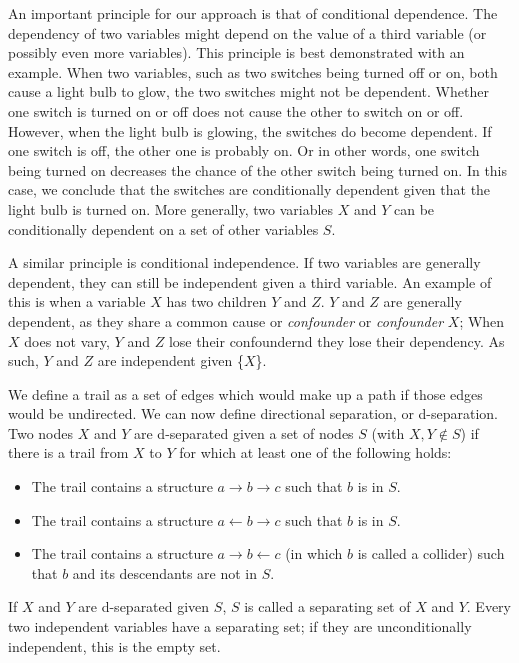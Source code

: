 \documentclass[a4paper, 10pt, english, onecolumn]{article}
\begin{document}
An important principle for our approach is that of conditional dependence.
The dependency of two variables might depend on the value of a third variable (or possibly even more variables).
This principle is best demonstrated with an example.
When two variables, such as two switches being turned off or on, both cause a light bulb to glow, the two switches might not be dependent.
Whether one switch is turned on or off does not cause the other to switch on or off.
However, when the light bulb is glowing, the switches do become dependent.
If one switch is off, the other one is probably on.
Or in other words, one switch being turned on decreases the chance of the other switch being turned on.
In this case, we conclude that the switches are conditionally dependent given that the light bulb is turned on.
More generally, two variables $X$ and $Y$ can be conditionally dependent on a set of other variables $S$. %

A similar principle is conditional independence.
If two variables are generally dependent, they can still be independent given a third variable.
An example of this is when a variable $X$ has two children $Y$ and $Z$.
$Y$ and $Z$ are generally dependent, as they share a common cause or \emph{confounder} or \emph{confounder} $X$;
When $X$ does not vary, $Y$ and $Z$ lose their confoundernd they lose their dependency.
As such, $Y$ and $Z$ are independent given \{$X$\}. 

We define a trail as a set of edges which would make up a path if those edges would be undirected.
We can now define directional separation, or d-separation.
Two nodes $X$ and $Y$ are d-separated given a set of nodes $S$ (with $X, Y \notin S$) if there is a trail from $X$ to $Y$ for which at least one of the following holds:
\begin{itemize}
\item The trail contains a structure $a \rightarrow b \rightarrow c$ such that $b$ is in $S$.
\item The trail contains a structure $a \leftarrow b \rightarrow c$ such that $b$ is in $S$.
\item The trail contains a structure $a \rightarrow b \leftarrow c$ (in which $b$ is called a collider) such that $b$ and its descendants are not in $S$.
\end{itemize}
If $X$ and $Y$ are d-separated given $S$, $S$ is called a separating set of $X$ and $Y$. Every two independent variables have a separating set; if they are unconditionally independent, this is the empty  set.
\end{document}
